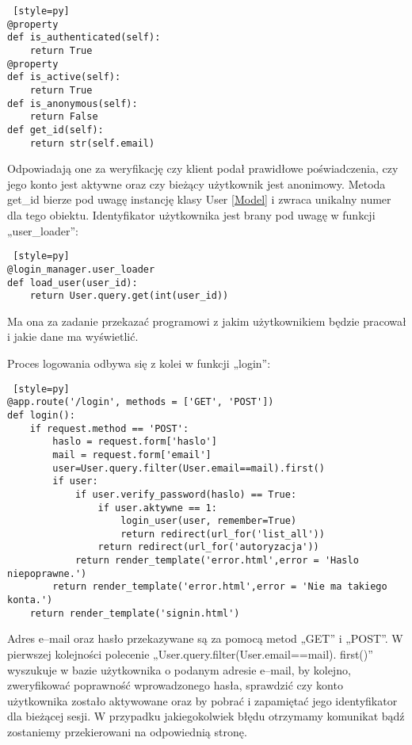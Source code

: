 \documentclass{xmgr}
\begin{document}
\newpage
\begin{lstlisting} [style=py] 
@property
def is_authenticated(self):
    return True
@property       
def is_active(self):
    return True
def is_anonymous(self):
    return False
def get_id(self):
   	return str(self.email)
\end{lstlisting}

Odpowiadają one za weryfikację czy klient podał prawidłowe poświadczenia, czy jego konto jest aktywne oraz czy bieżący użytkownik jest anonimowy. Metoda get\_id bierze pod uwagę instancję klasy User \ref{Model} i zwraca unikalny numer dla tego obiektu. Identyfikator użytkownika jest brany pod uwagę w funkcji „user\_loader”:

\begin{lstlisting} [style=py] 
@login_manager.user_loader
def load_user(user_id):
    return User.query.get(int(user_id))
\end{lstlisting}

Ma ona za zadanie przekazać programowi z jakim użytkownikiem będzie pracował i jakie dane ma wyświetlić. 

Proces logowania odbywa się z kolei w funkcji „login”:

\begin{lstlisting} [style=py] 
@app.route('/login', methods = ['GET', 'POST'])
def login():
    if request.method == 'POST':
        haslo = request.form['haslo']
        mail = request.form['email']
        user=User.query.filter(User.email==mail).first()
        if user:
            if user.verify_password(haslo) == True:
                if user.aktywne == 1:
                    login_user(user, remember=True)
                    return redirect(url_for('list_all'))             
                return redirect(url_for('autoryzacja'))
            return render_template('error.html',error = 'Haslo niepoprawne.')
        return render_template('error.html',error = 'Nie ma takiego konta.')       
    return render_template('signin.html')
\end{lstlisting}

Adres e--mail oraz hasło przekazywane są za pomocą metod „GET” i „POST”. W pierwszej kolejności  polecenie „User.query.filter(User.email==mail). first()” wyszukuje w bazie użytkownika o podanym adresie e--mail, by kolejno, zweryfikować poprawność wprowadzonego hasła, sprawdzić czy konto użytkownika zostało aktywowane oraz by pobrać i zapamiętać jego identyfikator dla bieżącej sesji. W przypadku jakiegokolwiek błędu otrzymamy komunikat bądź zostaniemy przekierowani na odpowiednią stronę. 
\end{document}
